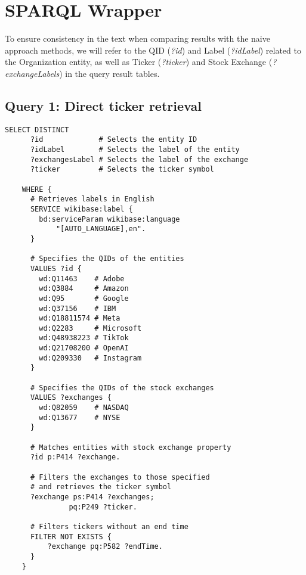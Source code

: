 \chapter{SPARQL Wrapper}
\label{app:sparql-wrapper}
To ensure consistency in the text when comparing results with the naive approach methods, we will refer to the QID (\textit{?id}) and Label (\textit{?idLabel}) related to the Organization entity, as well as Ticker (\textit{?ticker}) and Stock Exchange (\textit{?exchangeLabels}) in the query result tables.

\section{Query 1: Direct ticker retrieval}
\label{appsec:q1-direct-ticker-retrieval}

\begin{lstlisting}[language=SPARQL, caption={SPARQL Query 1: Retrieve entity information for entities directly with the \textit{stock exchange} property.}, label={lst:sparql_query_1}]
    SELECT DISTINCT 
      ?id             # Selects the entity ID
      ?idLabel        # Selects the label of the entity
      ?exchangesLabel # Selects the label of the exchange
      ?ticker         # Selects the ticker symbol
    
    WHERE {
      # Retrieves labels in English
      SERVICE wikibase:label {
        bd:serviceParam wikibase:language 
            "[AUTO_LANGUAGE],en".
      }
    
      # Specifies the QIDs of the entities
      VALUES ?id { 
        wd:Q11463    # Adobe
        wd:Q3884     # Amazon
        wd:Q95       # Google
        wd:Q37156    # IBM
        wd:Q18811574 # Meta
        wd:Q2283     # Microsoft
        wd:Q48938223 # TikTok
        wd:Q21708200 # OpenAI
        wd:Q209330   # Instagram
      }
    
      # Specifies the QIDs of the stock exchanges
      VALUES ?exchanges { 
        wd:Q82059    # NASDAQ
        wd:Q13677    # NYSE
      }
    
      # Matches entities with stock exchange property
      ?id p:P414 ?exchange.
    
      # Filters the exchanges to those specified 
      # and retrieves the ticker symbol
      ?exchange ps:P414 ?exchanges; 
               pq:P249 ?ticker.

      # Filters tickers without an end time
      FILTER NOT EXISTS {
          ?exchange pq:P582 ?endTime.
      }
    }
\end{lstlisting}


